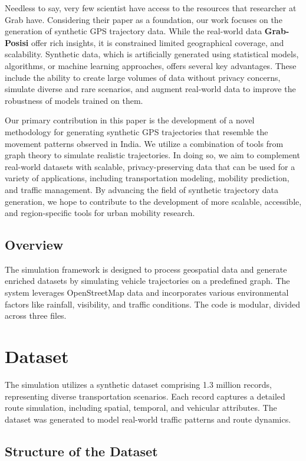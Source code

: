 \documentclass[sigplan,screen]{acmart}
\begin{document}
Needless to say, very few scientist have access to the resources
that researcher at Grab have.
Considering their paper as a foundation, our work focuses on the generation of synthetic GPS trajectory data. 
While the real-world data \textbf{Grab-Posisi} offer rich insights, it is
constrained limited geographical coverage, and scalability. 
Synthetic data, which is artificially generated using statistical models, algorithms, or machine learning approaches, offers several key advantages. These include the ability to create large volumes of data without privacy concerns, simulate diverse and rare scenarios, and augment real-world data to improve the robustness of models trained on them.

Our primary contribution in this paper is the development of a novel methodology for generating synthetic GPS trajectories that resemble the movement patterns observed in India. 
We utilize a combination of tools from graph theory to 
simulate realistic trajectories. 
In doing so, we aim to complement real-world datasets with scalable, privacy-preserving data that can be used for a variety of applications, including transportation modeling, mobility prediction, and traffic management.
By advancing the field of synthetic trajectory data generation, we hope to contribute to the development of more scalable, accessible, and region-specific tools for urban mobility research.

\subsection{Overview}
The simulation framework is designed to process geospatial data and generate enriched datasets by simulating vehicle trajectories on a predefined graph.
The system leverages OpenStreetMap data and incorporates various environmental factors like rainfall, visibility, and traffic conditions. The code is modular, divided across three files.

\section{Dataset}

The simulation utilizes a synthetic dataset comprising 1.3 million records, representing diverse transportation scenarios. Each record captures a detailed route simulation, including spatial, temporal, and vehicular attributes. The dataset was generated to model real-world traffic patterns and route dynamics.

\subsection{Structure of the Dataset}
\end{document}
